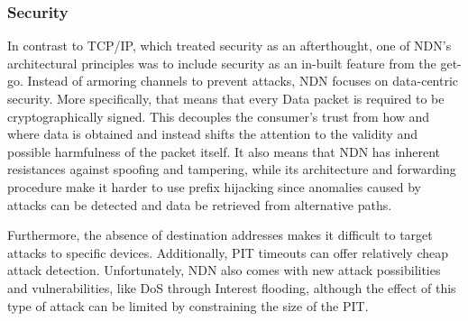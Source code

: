 %
%
%

\subsubsection{Security}
In contrast to TCP/IP, which treated security as an afterthought, one of NDN's architectural principles was to include security as an in-built feature from the get-go. \cite{ZEBJ10} Instead of armoring channels to prevent attacks, NDN focuses on data-centric security. More specifically, that means that every Data packet is required to be cryptographically signed. This decouples the consumer's trust from how and where data is obtained and instead shifts the attention to the validity and possible harmfulness of the packet itself. It also means that NDN has inherent resistances against spoofing and tampering, while its architecture and forwarding procedure make it harder to use prefix hijacking since anomalies caused by attacks can be detected and data be retrieved from alternative paths. 

Furthermore, the absence of destination addresses makes it difficult to target attacks to specific devices. Additionally, PIT timeouts can offer relatively cheap attack detection. Unfortunately, NDN also comes with new attack possibilities and vulnerabilities, like DoS through Interest flooding, although the effect of this type of attack can be limited by constraining the size of the PIT. \cite{ZABJ14}
